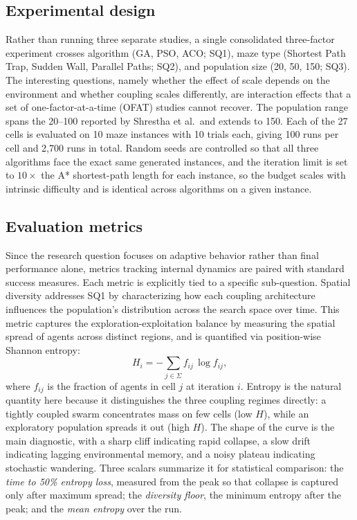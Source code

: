 \documentclass[11pt,a4paper]{article}
\begin{document}
    \subsection{Experimental design} \label{design}
    Rather than running three separate studies, a single consolidated three-factor experiment crosses algorithm (GA, PSO, ACO; SQ1), maze type (Shortest Path Trap, Sudden Wall, Parallel Paths; SQ2), and population size (20, 50, 150; SQ3). The interesting questions, namely whether the effect of scale depends on the environment and whether coupling scales differently, are interaction effects that a set of one-factor-at-a-time (OFAT) studies cannot recover. The population range spans the 20--100 reported by Shrestha et al.\ and extends to 150. Each of the 27 cells is evaluated on 10 maze instances with 10 trials each, giving 100 runs per cell and 2{,}700 runs in total. Random seeds are controlled so that all three algorithms face the exact same generated instances, and the iteration limit is set to $10\times$ the A* shortest-path length for each instance, so the budget scales with intrinsic difficulty and is identical across algorithms on a given instance.

    \subsection{Evaluation metrics} \label{metrics}
    Since the research question focuses on adaptive behavior rather than final performance alone, metrics tracking internal dynamics are paired with standard success measures. Each metric is explicitly tied to a specific sub-question. Spatial diversity addresses SQ1 by characterizing how each coupling architecture influences the population's distribution across the search space over time. This metric captures the exploration-exploitation balance by measuring the spatial spread of agents across distinct regions, and is quantified via position-wise Shannon entropy:
    \[
        H_i = -\sum_{j \in \Sigma} f_{ij}\,\log f_{ij},
    \]
    where $f_{ij}$ is the fraction of agents in cell $j$ at iteration $i$. Entropy is the natural quantity here because it distinguishes the three coupling regimes directly: a tightly coupled swarm concentrates mass on few cells (low $H$), while an exploratory population spreads it out (high $H$). The shape of the curve is the main diagnostic, with a sharp cliff indicating rapid collapse, a slow drift indicating lagging environmental memory, and a noisy plateau indicating stochastic wandering. Three scalars summarize it for statistical comparison: the \emph{time to 50\% entropy loss}, measured from the peak so that collapse is captured only after maximum spread; the \emph{diversity floor}, the minimum entropy after the peak; and the \emph{mean entropy} over the run.
\end{document}
